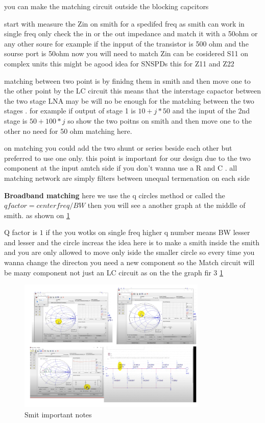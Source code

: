 \documentclass{article}
\begin{document}
\begin{itemize}
you can make the matching circuit outside the blocking capcitors

start with measure the Zin on smith for a spedifed freq as smith can work in single freq only check the in or the out impedance and match it with a 50ohm or any other soure 
for example if the inpput of the transistor is 500 ohm and the  sourse port is 50ohm  now you will need to match 
Zin can be cosidered S11 on complex units this might be agood idea for SNSPDs 
this for Z11 and Z22 


matching between two point is by finidng them in smith and then move one to the other point by the LC circuit this means that the interstage capactor between the two stage LNA 
may be will no be enough for the matching between the two stages . for example if output of stage 1 is  $10+j*50$  and the  input of the  2nd stage is  $50+100*j$
so show the two poitns on smith and then move one to the other no need for 50 ohm matching here.

on matching you could add the two shunt or series beside each other but preferred to use one only. this point is important for our design due to the two component at the input amtch side if you don't wanna use a R and C .
all matching network are simply filters between unequal termenation on each side 


\textbf{Broadband matching}
here we use the q circles method or called the $q factor = center freq / BW $ then you will see a another graph at the middle of smith. as shown on \cref{Anurug rf6_2} 

Q factor is $1$ if the  you wotks on single freq  higher q number means BW lesser and lesser and the circle increas 
the idea here is to make a smith inside the smith and you are only allowed to move only iside the smaller circle so every time you wanna change the directon you need a new component so the Match circuit will be  many component not just an LC circuit as on the the graph fir 3   \cref{Anurug rf6_2}  

\begin{figure}[H]
    \centering
    \includegraphics[width=0.8\textwidth]{figures/Anurug rf6_2.pdf}
    \caption{Smit important notes }
    \label{Anurug rf6_2}
\end{figure}



\end{itemize}
\end{document}
